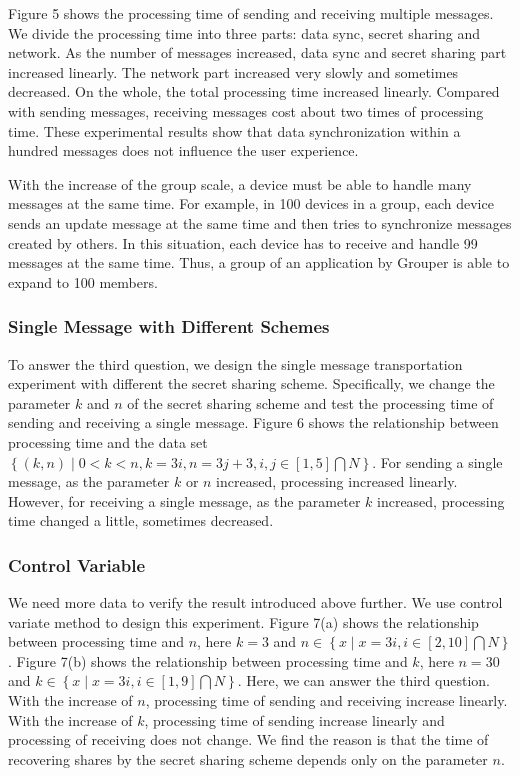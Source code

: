 \documentclass[twocolumn,10pt]{article}
\begin{document}
Figure 5 shows the processing time of sending and receiving multiple messages.
We divide the processing time into three parts: data sync, secret sharing and network.
As the number of messages increased, data sync and secret sharing part increased linearly. 
The network part increased very slowly and sometimes decreased.
On the whole, the total processing time increased linearly.
Compared with sending messages, receiving messages cost about two times of processing time.
These experimental results show that data synchronization within a hundred messages does not influence the user experience.

With the increase of the group scale, a device must be able to handle many messages at the same time.
For example, in 100 devices in a group, each device sends an update message at the same time and then tries to synchronize messages created by others.
In this situation, each device has to receive and handle 99 messages at the same time.
Thus, a group of an application by Grouper is able to expand to 100 members.

\subsubsection{Single Message with Different Schemes}

To answer the third question, we design the single message transportation experiment with different the secret sharing scheme.
Specifically, we change the parameter ${k}$  and ${n}$ of the secret sharing scheme and test the processing time of sending and receiving a single message.
Figure 6 shows the relationship between processing time and the data set ${\left \{ \left (k, n \right )\mid 0< k < n, k=3i, n=3j+3, i, j\in\left [ 1,5 \right ]\bigcap N\right \}}$.
For sending a single message, as the parameter ${k}$ or ${n}$ increased, processing increased linearly.
However, for receiving a single message, as the parameter ${k}$ increased, processing time  changed a little, sometimes decreased.

\subsubsection{Control Variable}

We need more data to verify the result introduced above further. 
We use control variate method to design this experiment.
Figure 7(a) shows the relationship between processing time and ${n}$, here ${k=3}$ and ${n \in \left \{ x\mid x=3i, i \in \left [ 2, 10 \right ] \bigcap N \right \}}$. 
Figure 7(b) shows the relationship between processing time and ${k}$, here ${n=30}$ and ${k \in \left \{ x\mid x=3i, i \in \left [ 1, 9 \right ] \bigcap N \right \}}$. 
Here, we can answer the third question.
With the increase of ${n}$, processing time of sending and receiving increase linearly.
With the increase of ${k}$, processing time of sending increase linearly and processing of receiving does not change.
We find the reason is that the time of recovering shares by the secret sharing scheme depends only on the parameter ${n}$.
\end{document}
